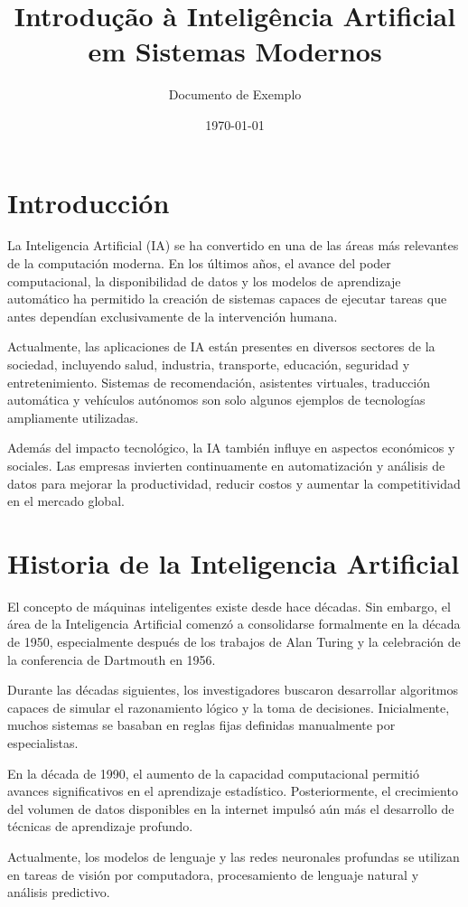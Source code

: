 \documentclass[11pt]{article}
\title{Introdução à Inteligência Artificial em Sistemas Modernos}
\author{Documento de Exemplo}
\date{\today}
\begin{document}
\section{Introducción}

La Inteligencia Artificial (IA) se ha convertido en una de las áreas más relevantes de la computación moderna.
En los últimos años, el avance del poder computacional, la disponibilidad de datos y los modelos
de aprendizaje automático ha permitido la creación de sistemas capaces de ejecutar tareas que
antes dependían exclusivamente de la intervención humana.

Actualmente, las aplicaciones de IA están presentes en diversos sectores de la sociedad, incluyendo salud,
industria, transporte, educación, seguridad y entretenimiento. Sistemas de recomendación,
asistentes virtuales, traducción automática y vehículos autónomos son solo algunos ejemplos
de tecnologías ampliamente utilizadas.

Además del impacto tecnológico, la IA también influye en aspectos económicos y sociales. Las empresas
invierten continuamente en automatización y análisis de datos para mejorar la productividad,
reducir costos y aumentar la competitividad en el mercado global. 

\section{Historia de la Inteligencia Artificial}

El concepto de máquinas inteligentes existe desde hace décadas. Sin embargo, el área de la Inteligencia
Artificial comenzó a consolidarse formalmente en la década de 1950, especialmente después de los
trabajos de Alan Turing y la celebración de la conferencia de Dartmouth en 1956.

Durante las décadas siguientes, los investigadores buscaron desarrollar algoritmos capaces de
simular el razonamiento lógico y la toma de decisiones. Inicialmente, muchos sistemas se basaban en
reglas fijas definidas manualmente por especialistas.

En la década de 1990, el aumento de la capacidad computacional permitió avances significativos en el
aprendizaje estadístico. Posteriormente, el crecimiento del volumen de datos disponibles en la
internet impulsó aún más el desarrollo de técnicas de aprendizaje profundo.

Actualmente, los modelos de lenguaje y las redes neuronales profundas se utilizan en tareas de visión
por computadora, procesamiento de lenguaje natural y análisis predictivo.
 
\end{document}
